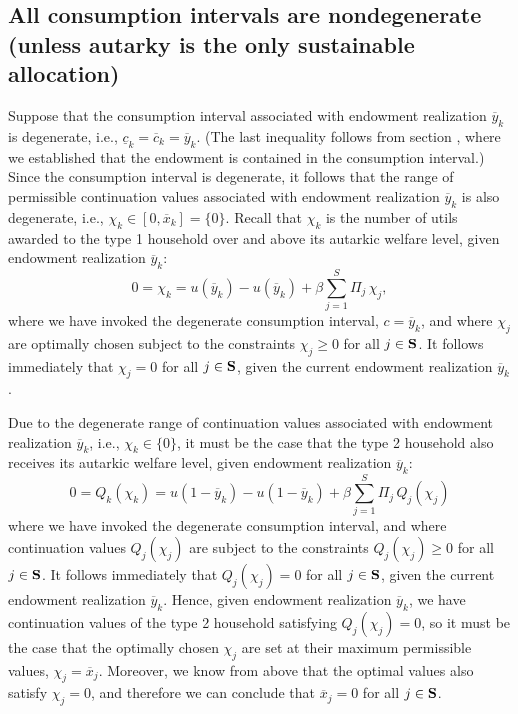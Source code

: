 \subsection{All consumption intervals are nondegenerate
 (unless autarky is the only sustainable allocation)}\label{sec:c_nondeg}%
Suppose that the consumption interval associated with endowment
realization $\overline y_k$ is degenerate, i.e., $\underline c_k =
\overline c_k = \overline y_k$. (The last inequality follows from
section , where we established that the endowment
is contained in the consumption interval.) Since the consumption
interval is degenerate, it follows that the range of permissible
continuation values associated with endowment realization
$\overline y_k$ is also degenerate, i.e., $\chi_k  \in [0,
\overline x_k]= \{0\}$. Recall that $\chi_k$ is the number of
utils awarded to the type 1 household over and above its autarkic
welfare level, given endowment realization $\overline y_k$:
$$
0=\chi_k = u(\overline y_k) - u(\overline y_k)
           + \beta \sum_{j=1}^S \Pi_j \,\chi_j ,
$$
where we have invoked the degenerate consumption interval,
$c=\overline y_k$,
and where $\chi_j$ are optimally chosen subject to the constraints
$\chi_j\geq 0$ for all $j\in {\bf S}$. It follows immediately that
$\chi_j=0$ for all $j\in {\bf S}$, given the current endowment
realization $\overline y_k$.

Due to the degenerate range of continuation values associated
with endowment realization $\overline y_k$, i.e.,
$\chi_k  \in \{0\}$, it must be the case that the type 2
household also receives its autarkic welfare level, given
endowment realization $\overline y_k$:
$$
0=Q_k(\chi_k) = u(1-\overline y_k) - u(1-\overline y_k)
           + \beta \sum_{j=1}^S \Pi_j \,Q_j(\chi_j)
$$
where we have invoked the degenerate consumption interval,
and where continuation values $Q_j(\chi_j)$ are subject to the constraints
$Q_j(\chi_j)\geq 0$ for all $j\in {\bf S}$. It follows immediately that
$Q_j(\chi_j)=0$ for all $j\in {\bf S}$, given the current endowment
realization $\overline y_k$.
Hence, given endowment realization $\overline y_k$, we have
continuation values of the type 2 household
satisfying $Q_j(\chi_j)=0$, so it must be the case that
the optimally chosen $\chi_j$ are set at their maximum
permissible values, $\chi_j = \overline x_j$. Moreover,
we know from above that the optimal values also satisfy $\chi_j=0$, and
therefore we can conclude that $\overline x_j=0$ for all $j\in {\bf S}$.

